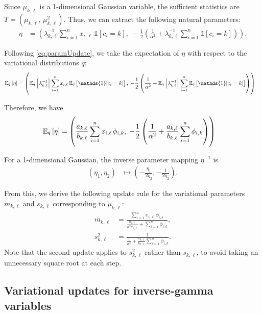 \documentclass[11pt]{article}
\begin{document}
Since $\mu_{k,\ell}$ is a 1-dimensional Gaussian variable, the sufficient statistics are $T = (\mu_{k,\ell}, \, \mu_{k,\ell}^2)$.
Thus, we can extract the following natural parameters:
\begin{align}
\eta &= \left(
    \lambda_{k,\ell}^{-1} \sum_{i=1}^n x_{i,\ell} \, \mathds{1}[c_i=k], \;
    -\frac{1}{2} \left( \frac{1}{\alpha^2} + \lambda_{k,\ell}^{-1} \sum_{i=1}^n \mathds{1}[c_i=k] \right)
\right).
\end{align}

Following \eqref{eq:paramUpdate}, we take the expectation of $\eta$ with respect to the variational distributions $q$:
\begin{align}
\expectOver{q}{\eta}
&=
\left(
    \expectOver{q}{\lambda_{k,\ell}^{-1}} \sum_{i=1}^n x_{i,\ell} \, \expectOver{q}{\mathds{1}[c_i=k]}, \;
    -\frac{1}{2} \left( \frac{1}{\alpha^2} + \expectOver{q}{\lambda_{k,\ell}^{-1}} \sum_{i=1}^n \expectOver{q}{\mathds{1}[c_i=k]} \right)
\right)
\end{align}

Therefore, we have
\begin{align}
\mathbb{E}_{\substack{q}}\left[ \eta \right]
&=
\left(
    \frac{a_{k,\ell}}{b_{k,\ell}} \sum_{i=1}^n x_{i,\ell} \, \phi_{i,k}, \;
    -\frac{1}{2} \left( \frac{1}{\alpha^2} + \frac{a_{k,\ell}}{b_{k,\ell}} \sum_{i=1}^n \phi_{i,k} \right)
\right)
\end{align}

For a 1-dimensional Gaussian, the inverse parameter mapping $\eta^{-1}$ is
\begin{align}
(\eta_1, \eta_2)
&\mapsto
\left( -\frac{\eta_1}{2 \eta_2}, -\frac{1}{2 \eta_2} \right).
\end{align}

From this, we derive the following update rule for the variational parameters $m_{k,\ell}$ and $s_{k,\ell}$ corresponding to $\mu_{k,\ell}$:
\begin{align}
\label{eq:exVarUpdateM}
m_{k,\ell} &= \frac{ \sum_{i=1}^n x_{i,\ell} \, \phi_{i,k} }
                   { \frac{b_{k,\ell}}{\alpha^2 a_{k,\ell}} + \sum_{i=1}^n \phi_{i,k} }, \\
\label{eq:exVarUpdateS}
s_{k,\ell}^2 &= \frac{ 1 }
                   { \frac{1}{\alpha^2} + \frac{a_{k,\ell}}{b_{k,\ell}} \sum_{i=1}^n \phi_{i,k} }.
\end{align}
Note that the second update applies to $s_{k,\ell}^2$ rather than $s_{k,\ell}$, to avoid taking an unnecessary square root at each step.

\subsection{Variational updates for inverse-gamma variables}
\end{document}
